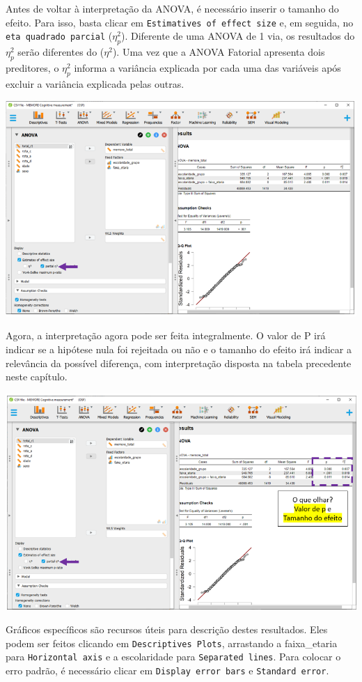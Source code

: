 \documentclass[
]{book}
\begin{document}
Antes de voltar à interpretação da ANOVA, é necessário inserir o tamanho do efeito. Para isso, basta clicar em \texttt{Estimatives\ of\ effect\ size} e, em seguida, no \texttt{eta\ quadrado\ parcial} (\(η_p^2\)). Diferente de uma ANOVA de 1 via, os resultados do \(η_p^2\) serão diferentes do (\(η^2\)). Uma vez que a ANOVA Fatorial apresenta dois preditores, o \(η_p^2\) informa a variância explicada por cada uma das variáveis após excluir a variância explicada pelas outras.

\includegraphics{./img/cap_anova_fatorial_tamanho_do_efeito.png}

Agora, a interpretação agora pode ser feita integralmente. O valor de P irá indicar se a hipótese nula foi rejeitada ou não e o tamanho do efeito irá indicar a relevância da possível diferença, com interpretação disposta na tabela precedente neste capítulo.

\includegraphics{./img/cap_anova_fatorial_resultados3.png}

Gráficos específicos são recursos úteis para descrição destes resultados. Eles podem ser feitos clicando em \texttt{Descriptives\ Plots}, arrastando a faixa\_etaria para \texttt{Horizontal\ axis} e a escolaridade para \texttt{Separated\ lines}. Para colocar o erro padrão, é necessário clicar em \texttt{Display\ error\ bars} e \texttt{Standard\ error}.
\end{document}

